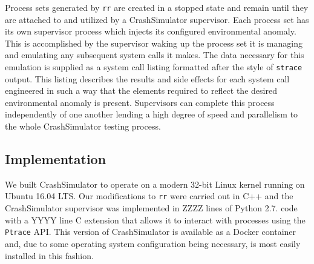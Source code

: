 Process sets generated by {\tt rr} are created in a stopped state and
remain until they are attached to and utilized by a CrashSimulator
supervisor.  Each process set has its own supervisor process which injects
its configured environmental anomaly.  This is accomplished by the
supervisor waking up the process set it is managing and emulating any
subsequent system calls it makes.  The data necessary for this emulation is
supplied as a system call listing formatted after the style of {\tt strace}
output. This listing describes the results and side effects for each system
call engineered in such a way that the elements required to reflect the
desired environmental anomaly is present.  Supervisors can complete this
process independently of one another lending a high degree of speed and
parallelism to the whole CrashSimulator testing process.

\subsection{Implementation}

We built CrashSimulator to operate on a modern 32-bit Linux kernel running
on Ubuntu 16.04 LTS.  Our modifications to {\tt rr} were carried out in C++
and the CrashSimulator supervisor was implemented in ZZZZ lines of Python
2.7. code with a YYYY line C extension that allows it to interact with
processes using the {\tt Ptrace} API.  This version of CrashSimulator is
available as a Docker container and, due to some operating system
configuration being necessary, is most easily installed in this fashion.
